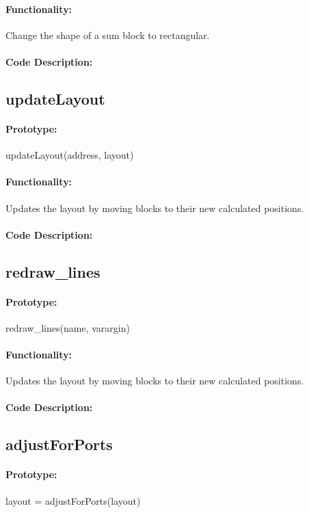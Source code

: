 \documentclass[12pt,letterpaper]{report}
\begin{document}
\paragraph{Functionality:} Change the shape of a sum block to rectangular.
\paragraph{Code Description:}

\subsection{updateLayout}
\paragraph{Prototype:} updateLayout(address, layout)
\paragraph{Functionality:} Updates the layout by moving blocks to their new calculated positions.
\paragraph{Code Description:}

\subsection{redraw\_lines}
\paragraph{Prototype:} redraw\_lines(name, varargin)
\paragraph{Functionality:} Updates the layout by moving blocks to their new calculated positions.
\paragraph{Code Description:}

\subsection{adjustForPorts}
\paragraph{Prototype:} layout = adjustForPorts(layout)
\end{document}
